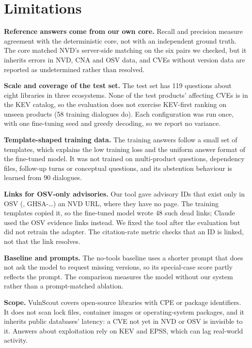 \documentclass[final]{cvpr}
\begin{document}
\section{Limitations}
\label{sec:limitations}

\textbf{Reference answers come from our own core.} Recall and precision measure agreement with the deterministic core, not with an independent ground truth. The core matched NVD's server-side matching on the six pairs we checked, but it inherits errors in NVD, CNA and OSV data, and CVEs without version data are reported as undetermined rather than resolved.

\textbf{Scale and coverage of the test set.} The test set has 119 questions about eight libraries in three ecosystems. None of the test products' affecting CVEs is in the KEV catalog, so the evaluation does not exercise KEV-first ranking on unseen products (58 training dialogues do). Each configuration was run once, with one fine-tuning seed and greedy decoding, so we report no variance.

\textbf{Template-shaped training data.} The training answers follow a small set of templates, which explains the low training loss and the uniform answer format of the fine-tuned model. It was not trained on multi-product questions, dependency files, follow-up turns or conceptual questions, and its abstention behaviour is learned from 90 dialogues.

\textbf{Links for OSV-only advisories.} Our tool gave advisory IDs that exist only in OSV (\eg, GHSA-\dots) an NVD URL, where they have no page. The training templates copied it, so the fine-tuned model wrote 48 such dead links; Claude used the OSV evidence links instead. We fixed the tool after the evaluation but did not retrain the adapter. The citation-rate metric checks that an ID is linked, not that the link resolves.

\textbf{Baseline and prompts.} The no-tools baseline uses a shorter prompt that does not ask the model to request missing versions, so its special-case score partly reflects the prompt. The comparison measures the model without our system rather than a prompt-matched ablation.

\textbf{Scope.} VulnScout covers open-source libraries with CPE or package identifiers. It does not scan lock files, container images or operating-system packages, and it inherits public databases' latency: a CVE not yet in NVD or OSV is invisible to it. Answers about exploitation rely on KEV and EPSS, which can lag real-world activity.

{\small


}
\end{document}
